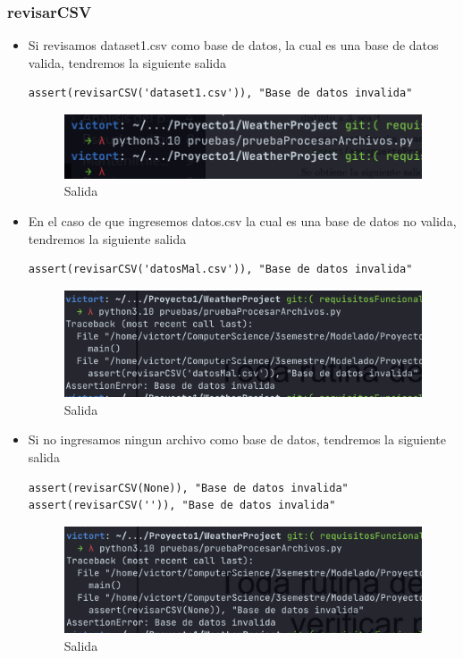 \documentclass[12pt]{article}
\begin{document}
\subsubsection{revisarCSV}
\begin{itemize}
\item Si revisamos dataset1.csv como base de datos, la cual es una base de datos valida, tendremos la siguiente salida
\begin{verbatim}
assert(revisarCSV('dataset1.csv')), "Base de datos invalida"
\end{verbatim}
  \begin{figure}[h!]
    \centering
    \includegraphics[scale=0.8]{pruebasPy/archivos/bien.png}
    \caption{Salida}
  \end{figure}

\item En el caso de que ingresemos datos.csv la cual es una base de datos no valida, tendremos la siguiente salida
\begin{verbatim}
assert(revisarCSV('datosMal.csv')), "Base de datos invalida"
\end{verbatim}
    \begin{figure}[h!]
    \centering
    \includegraphics[scale=0.6]{pruebasPy/archivos/datosMal.png}
    \caption{Salida}
  \end{figure}

\item Si no ingresamos ningun archivo como base de datos, tendremos la siguiente salida
\begin{verbatim}
assert(revisarCSV(None)), "Base de datos invalida"
assert(revisarCSV('')), "Base de datos invalida"
\end{verbatim}
    \begin{figure}[h!]
    \centering
    \includegraphics[scale=0.6]{pruebasPy/archivos/datosNone.png}
    \caption{Salida}
  \end{figure}
  

\end{itemize}
\end{document}
